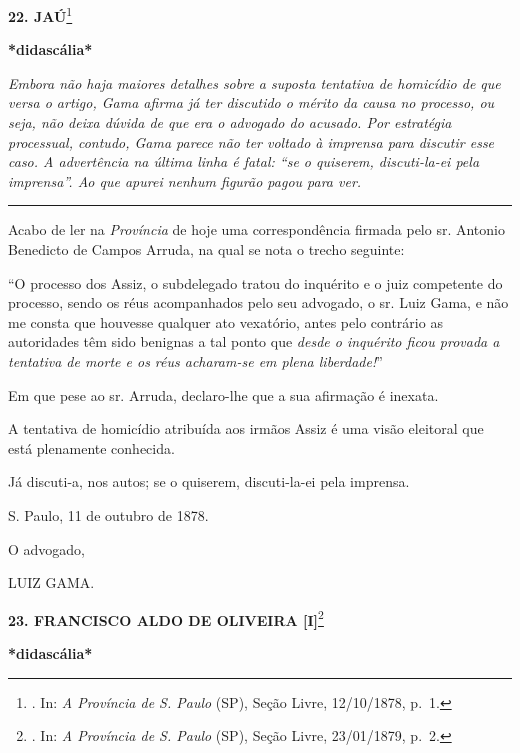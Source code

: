 \textbf{22. JAÚ}\footnote{. In: \emph{A Província de S. Paulo} (SP),
  Seção Livre, 12/10/1878, p.~1.}

\textbf{*didascália*}

\emph{Embora não haja maiores detalhes sobre a suposta tentativa de
homicídio de que versa o artigo, Gama afirma já ter discutido o mérito
da causa no processo, ou seja, não deixa dúvida de que era o advogado do
acusado. Por estratégia processual, contudo, Gama parece não ter voltado
à imprensa para discutir esse caso. A advertência na última linha é
fatal: ``se o quiserem, discuti-la-ei pela imprensa''. Ao que apurei
nenhum figurão pagou para ver. }

\begin{center}\rule{0.5\linewidth}{\linethickness}\end{center}

Acabo de ler na \emph{Província} de hoje uma correspondência firmada
pelo sr. Antonio Benedicto de Campos Arruda, na qual se nota o trecho
seguinte:

``O processo dos Assiz, o subdelegado tratou do inquérito e o juiz
competente do processo, sendo os réus acompanhados pelo seu advogado, o
sr. Luiz Gama, e não me consta que houvesse qualquer ato vexatório,
antes pelo contrário as autoridades têm sido benignas a tal ponto que
\emph{desde o inquérito ficou provada a tentativa de morte e os réus
acharam-se em plena liberdade!}''

Em que pese ao sr. Arruda, declaro-lhe que a sua afirmação é inexata.

A tentativa de homicídio atribuída aos irmãos Assiz é uma visão
eleitoral que está plenamente conhecida.

Já discuti-a, nos autos; se o quiserem, discuti-la-ei pela imprensa.

S. Paulo, 11 de outubro de 1878.

O advogado,

LUIZ GAMA.

\textbf{23. FRANCISCO ALDO DE OLIVEIRA {[}I{]}}\footnote{. In: \emph{A
  Província de S. Paulo} (SP), Seção Livre, 23/01/1879, p.~2.}

\textbf{*didascália*}

